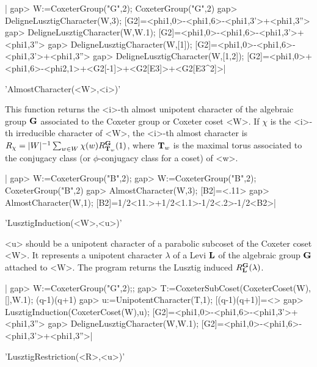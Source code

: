 |    gap> W:=CoxeterGroup("G",2);
    CoxeterGroup("G",2)
    gap> DeligneLusztigCharacter(W,3);
    [G2]=<phi{1,0}>-<phi{1,6}>-<phi{1,3}'>+<phi{1,3}''>
    gap> DeligneLusztigCharacter(W,W.1);
    [G2]=<phi{1,0}>-<phi{1,6}>-<phi{1,3}'>+<phi{1,3}''>
    gap> DeligneLusztigCharacter(W,[1]);
    [G2]=<phi{1,0}>-<phi{1,6}>-<phi{1,3}'>+<phi{1,3}''>
    gap> DeligneLusztigCharacter(W,[1,2]);
    [G2]=<phi{1,0}>+<phi{1,6}>-<phi{2,1}>+<G2[-1]>+<G2[E3]>+<G2[E3^2]>|


'AlmostCharacter(<W>,<i>)'

This  function  returns  the  <i>-th  almost  unipotent  character  of  the
algebraic group ${\bf G}$ associated to the Coxeter group or Coxeter coset <W>.
If  $\chi$ is  the <i>-th  irreducible character  of <W>, the <i>-th almost
character  is $R_\chi=|W|^{-1}\sum_{w\in W}\chi(w) R_{{\bf T}_w}^{\bf G}(1)$, where
${\bf T}_w$  is  the  maximal  torus  associated  to  the  conjugacy  class (or
$\phi$-conjugacy class for a coset) of <w>.

|    gap> W:=CoxeterGroup("B",2);
    gap> W:=CoxeterGroup("B",2);
    CoxeterGroup("B",2)
    gap> AlmostCharacter(W,3);
    [B2]=<.11>
    gap> AlmostCharacter(W,1);
    [B2]=1/2<11.>+1/2<1.1>-1/2<.2>-1/2<B2>|


'LusztigInduction(<W>,<u>)'

<u>  should be a unipotent character of a parabolic subcoset of the Coxeter
coset <W>. It represents a unipotent character $\lambda$ of a Levi ${\bf L}$ of
the  algebraic group ${\bf G}$ attached to <W>. The program returns the Lusztig
induced $R_{\bf L}^{\bf G}(\lambda)$.

|    gap> W:=CoxeterGroup("G",2);;
    gap> T:=CoxeterSubCoset(CoxeterCoset(W),[],W.1);
    (q-1)(q+1)
    gap> u:=UnipotentCharacter(T,1);
    [(q-1)(q+1)]=<>
    gap> LusztigInduction(CoxeterCoset(W),u);
    [G2]=<phi{1,0}>-<phi{1,6}>-<phi{1,3}'>+<phi{1,3}''>
    gap> DeligneLusztigCharacter(W,W.1);
    [G2]=<phi{1,0}>-<phi{1,6}>-<phi{1,3}'>+<phi{1,3}''>|


'LusztigRestriction(<R>,<u>)'

